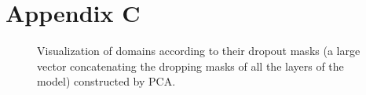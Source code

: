 \documentclass[11pt]{article}
\begin{document}
\section{Appendix C}
\begin{figure}[H]
\caption{Visualization of domains according to their dropout masks (a large vector concatenating the dropping masks of all the layers of the model) constructed by PCA.}
\label{fig:domain}
\end{figure}
\end{document}
